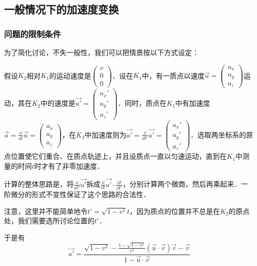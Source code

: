 

\subsection{一般情况下的加速度变换}
\subsubsection{问题的限制条件}

为了简化讨论，不失一般性，我们可以把情景按以下方式设定：

假设$K_2$相对$K_1$的运动速度是$\left(\begin{matrix}v\\0\\0\end{matrix} \right) $．设在$K_1$中，有一质点以速度$\vec{u}=\left(\begin{matrix}u_x\\u_y\\u_z\end{matrix} \right) \tag{2}$运动，其在$K_2$中的速度是$\vec{u'}=\left(\begin{matrix}u_x'\\u_y'\\u_z'\end{matrix} \right) $．同时，质点在$K_1$中有加速度$\vec{a}=\frac{\dd}{\dd{t}}\vec{u}=\left(\begin{matrix}a_x\\a_y\\a_z\end{matrix} \right)$，在$K_2$中加速度则为$\vec{a'}=\frac{\dd}{\dd{t'}}\vec{u'}=\left(\begin{matrix}a_x'\\a_y'\\a_z'\end{matrix} \right)$．选取两坐标系的原点位置使它们重合、在质点轨迹上，并且设质点一直以匀速运动，直到在$K_1$中测量的时间$t$时才有了非零加速度．

计算的整体思路是，将$\frac{\dd}{\dd{t'}}\vec{u'}$拆成$\frac{\dd}{\dd{t}}\vec{u'}\cdot\frac{\dd{t}}{\dd{t'}}$，分别计算两个微商，然后再乘起来．一阶微分的形式不变性保证了这个思路的合法性．

注意，这里并不能简单地令$t'=\sqrt{1-v^2}t$，因为质点的位置并不总是在$K_2$的原点处，我们需要选所讨论位置的$t'$．

于是有
\begin{equation}\label{SRAcc_eq2}
\vec{u'}=\frac{\sqrt{1-v^2}-\frac{1-\sqrt{1-v^2}}{v^2}(\vec{u}\cdot\vec{v})\vec{v}-\vec{v}}{1-\vec{u}\cdot\vec{v}}
\end{equation}

